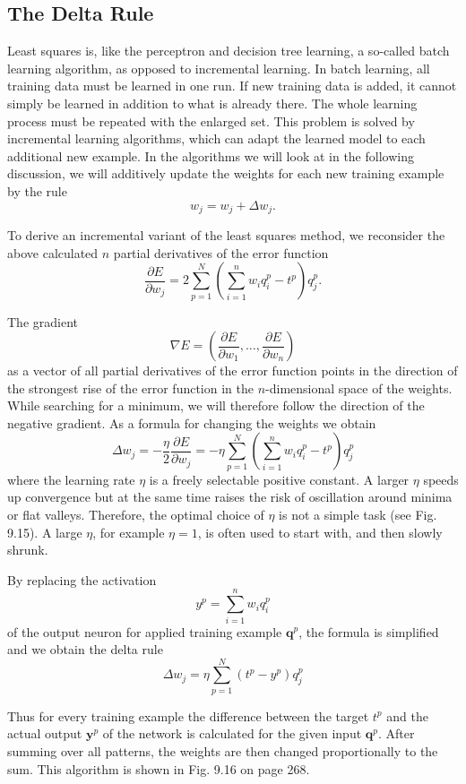 \documentclass[10pt]{book}
\begin{document}
\subsection{The Delta Rule}
Least squares is, like the perceptron and decision tree learning, a so-called batch learning algorithm, as opposed to incremental learning. In batch learning, all training data must be learned in one run. If new training data is added, it cannot simply be learned in addition to what is already there. The whole learning process must be repeated with the enlarged set. This problem is solved by incremental learning algorithms, which can adapt the learned model to each additional new example. In the algorithms we will look at in the following discussion, we will additively update the weights for each new training example by the rule
$$
w_{j}=w_{j}+\Delta w_{j} .
$$

To derive an incremental variant of the least squares method, we reconsider the above calculated $n$ partial derivatives of the error function
$$
\frac{\partial E}{\partial w_{j}}=2 \sum_{p=1}^{N}\left(\sum_{i=1}^{n} w_{i} q_{i}^{p}-t^{p}\right) q_{j}^{p} .
$$

The gradient
$$
\nabla E=\left(\frac{\partial E}{\partial w_{1}}, \ldots, \frac{\partial E}{\partial w_{n}}\right)
$$
as a vector of all partial derivatives of the error function points in the direction of the strongest rise of the error function in the $n$-dimensional space of the weights. While searching for a minimum, we will therefore follow the direction of the negative gradient. As a formula for changing the weights we obtain
$$
\Delta w_{j}=-\frac{\eta}{2} \frac{\partial E}{\partial w_{j}}=-\eta \sum_{p=1}^{N}\left(\sum_{i=1}^{n} w_{i} q_{i}^{p}-t^{p}\right) q_{j}^{p}
$$
where the learning rate $\eta$ is a freely selectable positive constant. A larger $\eta$ speeds up convergence but at the same time raises the risk of oscillation around minima or flat valleys. Therefore, the optimal choice of $\eta$ is not a simple task (see Fig. 9.15). A large $\eta$, for example $\eta=1$, is often used to start with, and then slowly shrunk.

By replacing the activation
$$
y^{p}=\sum_{i=1}^{n} w_{i} q_{i}^{p}
$$
of the output neuron for applied training example $\boldsymbol{q}^{p}$, the formula is simplified and we obtain the delta rule
$$
\Delta w_{j}=\eta \sum_{p=1}^{N}\left(t^{p}-y^{p}\right) q_{j}^{p}
$$

Thus for every training example the difference between the target $t^{p}$ and the actual output $\boldsymbol{y}^{p}$ of the network is calculated for the given input $\boldsymbol{q}^{p}$. After summing over all patterns, the weights are then changed proportionally to the sum. This algorithm is shown in Fig. 9.16 on page 268.
\end{document}
